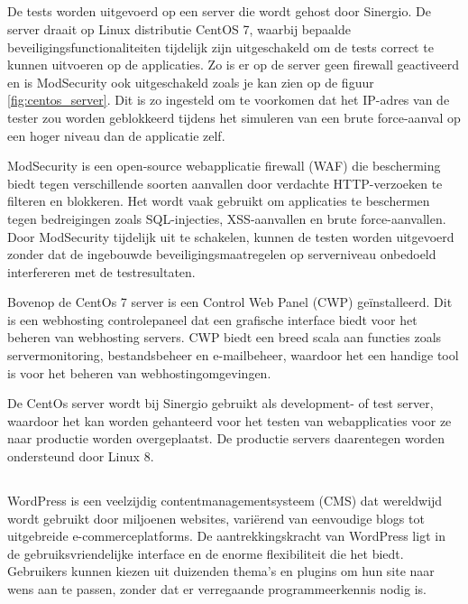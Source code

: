 \subsection{}
De tests worden uitgevoerd op een server die wordt gehost door Sinergio. De server draait op Linux distributie CentOS 7, waarbij bepaalde 
beveiligingsfunctionaliteiten tijdelijk zijn uitgeschakeld om de tests correct te kunnen uitvoeren op de applicaties. Zo is er op de server 
geen firewall geactiveerd en is ModSecurity ook uitgeschakeld zoals je kan zien op de figuur \ref{fig:centos_server}. Dit is 
zo ingesteld om te voorkomen dat het IP-adres van de tester zou worden geblokkeerd tijdens het simuleren van een brute 
force-aanval op een hoger niveau dan de applicatie zelf.

ModSecurity is een open-source webapplicatie firewall (WAF) die bescherming biedt tegen verschillende soorten aanvallen door 
verdachte HTTP-verzoeken te filteren en blokkeren. Het wordt vaak gebruikt om applicaties te beschermen tegen bedreigingen 
zoals SQL-injecties, XSS-aanvallen en brute force-aanvallen. Door ModSecurity tijdelijk uit te schakelen, kunnen de testen 
worden uitgevoerd zonder dat de ingebouwde beveiligingsmaatregelen op serverniveau onbedoeld interfereren met de testresultaten.

Bovenop de CentOs 7 server is een Control Web Panel (CWP) geïnstalleerd. Dit is een webhosting controlepaneel dat
een grafische interface biedt voor het beheren van webhosting servers. CWP biedt een breed scala aan functies zoals
servermonitoring, bestandsbeheer en e-mailbeheer, waardoor het een handige tool is voor het beheren van webhostingomgevingen.

De CentOs server wordt bij Sinergio gebruikt als development- of test server, waardoor het kan worden gehanteerd voor het 
testen van webapplicaties voor ze naar productie worden overgeplaatst. De productie servers daarentegen worden ondersteund 
door Linux 8.

\subsection{}
WordPress is een veelzijdig contentmanagementsysteem (CMS) dat wereldwijd wordt gebruikt door miljoenen websites, variërend van 
eenvoudige blogs tot uitgebreide e-commerceplatforms. De aantrekkingskracht van WordPress ligt in de gebruiksvriendelijke 
interface en de enorme flexibiliteit die het biedt. Gebruikers kunnen kiezen uit duizenden thema's en plugins om hun site 
naar wens aan te passen, zonder dat er verregaande programmeerkennis nodig is. 


